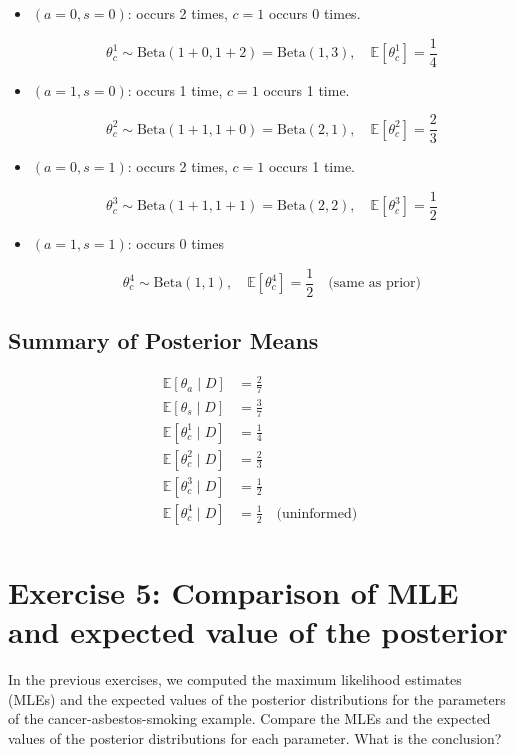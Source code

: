 \documentclass[11pt]{article}
\begin{document}
\begin{itemize}
  \item \((a=0, s=0)\): occurs 2 times, \(c=1\) occurs 0 times.

  \[
  \theta_c^1 \sim \text{Beta}(1 + 0, 1 + 2) = \text{Beta}(1, 3), \quad \mathbb{E}[\theta_c^1] = \frac{1}{4}
  \]

  \item \((a=1, s=0)\): occurs 1 time, \(c=1\) occurs 1 time.

  \[
  \theta_c^2 \sim \text{Beta}(1 + 1, 1 + 0) = \text{Beta}(2, 1), \quad \mathbb{E}[\theta_c^2] = \frac{2}{3}
  \]

  \item \((a=0, s=1)\): occurs 2 times, \(c=1\) occurs 1 time.

  \[
  \theta_c^3 \sim \text{Beta}(1 + 1, 1 + 1) = \text{Beta}(2, 2), \quad \mathbb{E}[\theta_c^3] = \frac{1}{2}
  \]

  \item \((a=1, s=1)\): occurs 0 times

  \[
  \theta_c^4 \sim \text{Beta}(1, 1), \quad \mathbb{E}[\theta_c^4] = \frac{1}{2} \quad \text{(same as prior)}
  \]
\end{itemize}

\subsection*{Summary of Posterior Means}

\[
\begin{array}{ll}
\mathbb{E}[\theta_a \mid D] &= \frac{2}{7} \\
\mathbb{E}[\theta_s \mid D] &= \frac{3}{7} \\
\mathbb{E}[\theta_c^1 \mid D] &= \frac{1}{4} \\
\mathbb{E}[\theta_c^2 \mid D] &= \frac{2}{3} \\
\mathbb{E}[\theta_c^3 \mid D] &= \frac{1}{2} \\
\mathbb{E}[\theta_c^4 \mid D] &= \frac{1}{2} \quad \text{(uninformed)} \\
\end{array}
\]


\fi

\section*{Exercise 5: Comparison of MLE and expected value of the posterior}

In the previous exercises, we computed the maximum likelihood estimates (MLEs) and the expected values of the posterior distributions for the parameters of the cancer-asbestos-smoking example. Compare the MLEs and the expected values of the posterior distributions for each parameter. What is the conclusion?
\end{document}
